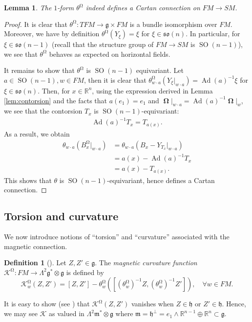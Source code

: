 \documentclass[12pt]{amsart}
\numberwithin{numbering}{section}
\theoremstyle{plain}
\newtheorem{lem}[numbering]{Lemma}
\theoremstyle{definition}
\newtheorem{df}[numbering]{Definition}
\theoremstyle{remark}
\numberwithin{equation}{section}
\DeclareMathOperator{\Ad}{Ad}
\DeclareMathOperator{\SO}{SO}
\DeclareMathOperator{\oo}{\mathbf{\Omega}}
\DeclareMathOperator{\mg}{\Omega}
\newcommand{\R}{\mathbb{R}}
\newcommand{\frk}[1]{\mathfrak{#1}}
\begin{document}
\begin{lem}
The $1$-form $\theta^{\mg}$ indeed defines a Cartan connection on $FM \to SM$.
\end{lem}

\begin{proof}
It is clear that $\theta^{\mg}: TFM \to \frk{g} \times FM$ is a bundle isomorphism over $FM$. Moreover, we have by definition $\theta^{\mg}(Y_\xi) = \xi$ for $\xi \in \frk{so}(n)$. In particular, for $\xi \in \frk{so}(n-1)$ (recall that the structure group of $FM \to SM$ is $\SO(n-1)$), we see that $\theta^{\mg}$ behaves as expected on horizontal fields.

It remains to show that $\theta^{\mg}$ is $\SO(n-1)$ equivariant. Let $a \in \SO(n-1), w \in FM$, then it is clear that $\theta^{\mg}_{w \cdot a} (Y_\xi \vert_{w \cdot a}) = \Ad(a)^{-1} \xi$ for $\xi \in \frk{so}(n)$. Then, for $x \in \R^n$, using the expression derived in Lemma \ref{lem:contorsion} and the facts that $a(e_1) = e_1$ and $\oo \vert_{w \cdot a} = \Ad(a)^{-1} \oo \vert_w$, we see that the contorsion $T_x$ is $\SO(n-1)$-equivariant:
\begin{align*}
\Ad(a)^{-1} T_x = T_{a(x)}. 
\end{align*}
As a result, we obtain
\begin{align*}
\theta_{w \cdot a} (B_{x}^{\mg} \vert_{w \cdot a})
&= \theta_{w \cdot a} (B_{x} - Y_{T_x} \vert_{w \cdot a}) \\ 
&= a(x) - \Ad(a)^{-1} T_{x} \\ 
&= a(x) - T_{a(x)}.
\end{align*}
This shows that $\theta$ is $\SO(n-1)$-equivariant, hence defines a Cartan connection.
\end{proof}



\subsection{Torsion and curvature} \label{sec:mag_torsion_curv}

We now introduce notions of “torsion” and “curvature” associated with the magnetic connection. 
\begin{df}[{{\cite[Definition 3.22]{sharpe2000differential}}}]
Let $Z, Z' \in \frk{g}$. The \emph{magnetic curvature function} $\mathscr{K}^{\mg}: FM \to \Lambda^2 \frk{g}^* \otimes \frk{g}$ is defined by 
\[ \mathscr{K}^{\mg}_w (Z, Z') = [Z, Z'] - \theta_w^{\mg}([(\theta^{\mg}_w)^{-1} Z, (\theta^{\mg}_w)^{-1} Z']), \quad \forall w \in FM. \]
\end{df} 
It is easy to show (see \cite[Corollary 3.10]{sharpe2000differential}) that $\mathscr{K}^{\mg}(Z, Z')$ vanishes when $Z \in \frk{h}$ or $Z' \in \frk{h}$. Hence, we may see $\mathscr{K}$ as valued in $\Lambda^2 \frk{m}^* \otimes \frk{g}$ where $\frk{m} = \frk{h}^\perp = e_1 \wedge \R^{n-1} \oplus \R^n \subset \frk{g}$.
\end{document}
